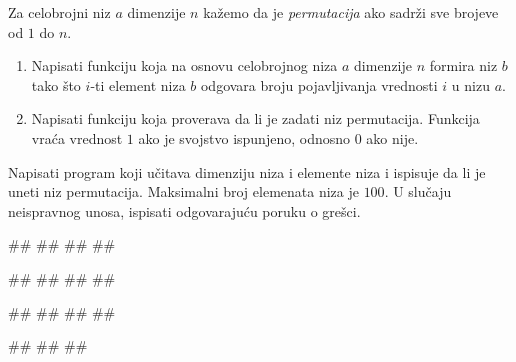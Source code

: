 \ifresenja
\begin{Answer}[ref=podniz]
\end{Answer}
\fi


\begin{Exercise}[label=permutacija] 
Za celobrojni niz $a$ dimenzije $n$ kažemo da je \textit{permutacija}
ako sadrži sve brojeve od $1$ do $n$.
\begin{enumerate}
\item Napisati funkciju 
  koja na osnovu celobrojnog niza $a$ dimenzije $n$ formira niz $b$
  tako što $i$-ti element niza $b$ odgovara broju pojavljivanja
  vrednosti $i$ u nizu $a$.
\item Napisati funkciju  koja
  proverava da li je zadati niz permutacija. Funkcija vraća vrednost
  $1$ ako je svojstvo ispunjeno, odnosno $0$ ako
  nije. 
\end{enumerate}
Napisati program koji učitava dimenziju niza i
elemente niza i ispisuje da li je uneti niz permutacija. 
Maksimalni broj elemenata niza je $100$.
U slučaju neispravnog unosa, ispisati odgovarajuću poruku o grešci. 

\begin{miditest}
\begin{upotreba}{1}
#\naslovInt#
##
##
##
\end{upotreba}
\end{miditest}
\begin{miditest}
\begin{upotreba}{2}
#\naslovInt#
##
##
##
\end{upotreba}
\end{miditest}

\begin{miditest}
\begin{upotreba}{3}
#\naslovInt#
##
##
##
\end{upotreba}
\end{miditest}
\begin{miditest}
\begin{upotreba}{4}
#\naslovInt#
##
##
\end{upotreba}
\end{miditest}
\end{Exercise}

